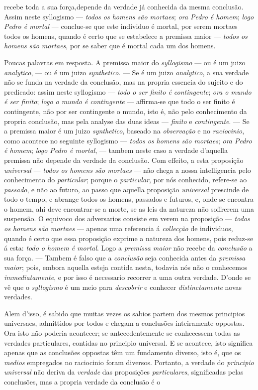 recebe toda a sua força,depende da verdade já conhecida da mesma conclusão. Assim neste syllogismo --- \emph{todos os homens são mortaes}; \emph{ora Pedro é homem}; \emph{logo Pedro é mortal} --- conclue-se que este individuo é mortal, por serem mortaes todos os homens, quando é certo que se estabelece a premissa maior --- \emph{todos os homens são mortaes}, por se saber que é mortal cada um dos homens.\par Poucas palavras em resposta. A premissa maior do \emph{syllogismo} --- ou é um juizo \emph{analytico}, --- ou é um juizo \emph{synthetico}. --- Se é um juizo \emph{analytico}, a sua verdade não se funda na verdade da conclusão, mas na propria essencia do sujeito e do predicado: assim neste syllogismo --- \emph{todo o ser finito é contingente}; \emph{ora o mundo é ser finito}; \emph{logo o mundo é contingente} --- affirma-se que todo o ser finito é contingente, não por ser contingente o mundo, isto é, não pelo conhecimento da propria conclusão, mas pela analyse das duas ideas --- \emph{finito} e \emph{contingente}. --- Se a premissa maior é um juizo \emph{synthetico}, baseado na \emph{observação} e no \emph{raciocinio}, como acontece no seguinte syllogismo --- \emph{todos os homens são mortaes}; \emph{ora Pedro é homem}; \emph{logo Pedro é mortal}, --- tambem neste caso a verdade d'aquella premissa não depende da verdade da conclusão. Com effeito, a esta proposição \emph{universal} --- \emph{todos os homens são mortaes} --- não chega a nossa intelligencia pelo conhecimento do \emph{particular}; porque o \emph{particular}, por nós conhecido, refere-se ao \emph{passado}, e não ao futuro, ao passo que aquella proposição \emph{universal} prescinde de todo o tempo, e abrange todos os homens, passados e futuros, e, onde se encontra o homem, ahi deve encontrar-se a morte, se as leis da natureza não soffrerem uma suspensão. O equivoco dos adversarios consiste em verem na proposição --- \emph{todos os homens são mortaes} --- apenas uma referencia á \emph{collecção} de individuos, quando é certo que essa proposição exprime a natureza dos homens, pois reduz-se á esta: \emph{todo o homem é mortal}. Logo a \emph{premissa maior} não recebe da \emph{conclusão} a sua força. --- Tambem é falso que a \emph{conclusão} seja conhecida antes da \emph{premissa maior}; pois, embora aquella esteja contida nesta, todavia nós não o conhecemos \emph{immediatamente}, e por isso é necessario recorrer a uma outra verdade. D'onde se vê que o \emph{syllogismo} é um meio para \emph{descobrir} e conhecer \emph{distinctamente} novas verdades.\par Alem d'isso, é sabido que muitas vezes os sabios partem dos mesmos principios universaes, admittidos por todos e chegam a conclusões inteiramente-oppostas. Ora isto não poderia acontecer; se antecedentemente se conhecessem todas as verdades particulares, contidas no principio universal. E se acontece, isto significa apenas que as conclusões oppostas têm um fundamento diverso, isto é, que os \emph{medios} empregados no raciocinio foram diversos. Portanto, a verdade do \emph{principio universal} não deriva da \emph{verdade} das proposições \emph{particulares}, significadas pelas conclusões, mas a propria verdade da conclusão é o 